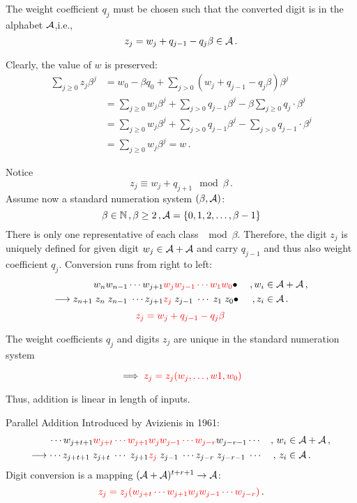      The weight coefficient $q_j$ must be chosen such that the converted digit is in the alphabet $\mathcal{A}$,i.e., 
    \begin{equation}
    \label{eq:conversionFormula}
        z_j=w_j + q_{j-1} - q_j \beta \in \mathcal{A}\,.
    \end{equation}
    
     Clearly, the value of $w$ is preserved:
\begin{align*}
    \sum_{j\geq 0} z_j \beta^j &=w_0 - \beta q_0 + \sum_{j> 0} (w_j + q_{j-1} - q_j \beta) \beta^j \\
    &=\sum_{j\geq 0} w_j \beta^j + \sum_{j>0} q_{j-1} \beta^j -  \beta \sum_{j\geq 0} q_j \cdot \beta^j \\
    &=\sum_{j\geq 0} w_j \beta^j + \sum_{j>0} q_{j-1} \beta^j - \sum_{j> 0} q_{j-1} \cdot \beta^j \\
    &=\sum_{j\geq 0} w_j \beta^j = w\,.
\end{align*}





    Notice
    $$
        z_j \equiv w_j+q_{j+1} \mod \beta\,. 
    $$
  Assume now a standard numeration system $(\beta, \mathcal{A})$:
  $$
    \beta \in \mathbb{N}\,,\beta  \geq 2\,, \mathcal{A} = \{0, 1, 2,\dots, \beta -1 \}
  $$ 
  There is only one representative of each class $\mod \beta$. Therefore, the digit $z_j$ is uniquely defined for given digit $w_j \in \mathcal{A}+\mathcal{A}$ and carry $q_{j-1}$ and thus also weight coefficient $q_j$. 
  Conversion runs from right to left:
  \begin{align*}
    w_n w_{n-1}\cdots w_{j+1}& \textcolor{red}{w_j w_{j-1} \cdots w_1 w_0}\bullet& \,,w_i &\in \mathcal{A}+\mathcal{A}\,,    \\
    \longrightarrow z_{n+1}\; z_{n}\; z_{n-1}\;\cdots z_{j+1} &\textcolor{red}{z_j} \; z_{j-1}\; \cdots \;z_1 \; z_0\bullet& \,,z_i &\in \mathcal{A}\,.
  \end{align*}
    $$
        \textcolor{red}{z_j=w_j + q_{j-1} - q_j \beta}\,
    $$
   
  
    The weight coefficients $q_j$ and digits $z_j$ are unique in the standard numeration system 
    
    $$
    \implies \textcolor{red}{z_j=z_j(w_j ,\dots , w1, w_0)}
    $$  
    
    Thus, addition is linear in length of inputs.




    {Parallel Addition}
    Introduced by Avizienis in 1961:
  \begin{align*}
    \cdots w_{j+t+1}\textcolor{red}{w_{j+t} \cdots w_{j+1}}& \textcolor{red}{w_j w_{j-1} \cdots w_{j-r}}w_{j-r-1} \cdots &,\, w_i &\in \mathcal{A} + \mathcal{A}\,,    \\
    \longrightarrow \cdots z_{j+t+1}\;z_{j+t} \; \cdots \; z_{j+1} &\textcolor{red}{z_j} \; z_{j-1}\; \cdots z_{j-r}\;z_{j-r-1}\; \cdots &,\, z_i &\in \mathcal{A}\,.
  \end{align*}
  Digit conversion is a mapping $(\mathcal{A}+\mathcal{A})^{t+r+1} \to \mathcal{A}$:%
  $$
    \textcolor{red}{z_j=z_j(w_{j+t} \cdots w_{j+1}w_j w_{j-1} \cdots w_{j-r})}\,.
  $$
  
